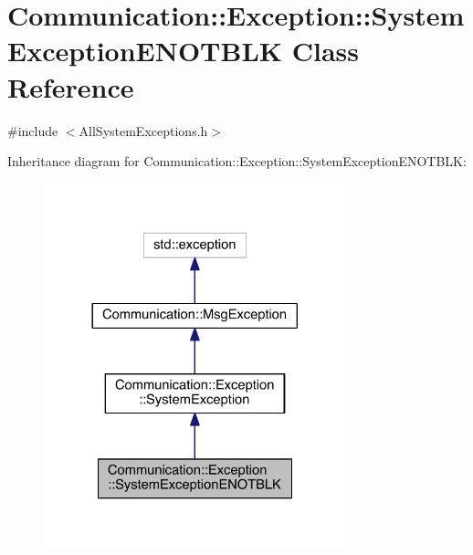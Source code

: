 \hypertarget{class_communication_1_1_exception_1_1_system_exception_e_n_o_t_b_l_k}{}\section{Communication\+:\+:Exception\+:\+:System\+Exception\+E\+N\+O\+T\+B\+L\+K Class Reference}
\label{class_communication_1_1_exception_1_1_system_exception_e_n_o_t_b_l_k}


{\ttfamily \#include $<$All\+System\+Exceptions.\+h$>$}



Inheritance diagram for Communication\+:\+:Exception\+:\+:System\+Exception\+E\+N\+O\+T\+B\+L\+K\+:\nopagebreak
\begin{figure}[H]
\begin{center}
\leavevmode
\includegraphics[width=248pt]{class_communication_1_1_exception_1_1_system_exception_e_n_o_t_b_l_k__inherit__graph}
\end{center}
\end{figure}



